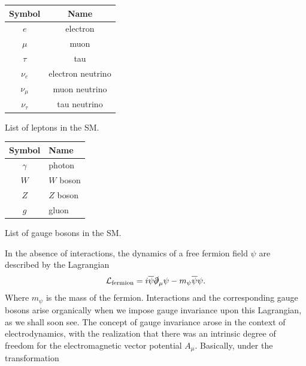 \begin{margintable}[-8cm]
  \centering
\begin{tabular}{c|c}
    Symbol & Name \\
  \hline
    $e$ & electron\\
    $\mu$ & muon \\
    $\tau$ & tau \\
    $\nu_e$ & electron neutrino \\
    $\nu_\mu$ & muon neutrino \\
    $\nu_\tau$ & tau neutrino \\
  \end{tabular}
  \caption{List of leptons in the SM.}
  \label{tab:leptons}
\end{margintable}

\begin{margintable}[-1cm]
  \centering
\begin{tabular}{c|l}
    Symbol & Name \\
  \hline
    $\gamma$ & photon\\
    $W$ & $W$ boson \\
    $Z$ & $Z$ boson \\
    $g$ & gluon \\
  \end{tabular}
  \caption{List of gauge bosons in the SM.}
  \label{tab:gaugebosons}
\end{margintable}

In the absence of interactions, the dynamics of a free fermion field $\psi$ are described by the Lagrangian
\begin{align}
  \mathcal{L}_\text{fermion} = i\overline{\psi}\slashed{\partial}_\mu\psi-m_{\psi}\overline{\psi}\psi.
\label{eq:fermion_lagrangian}
\end{align}
Where $m_\psi$ is the mass of the fermion. Interactions and the corresponding gauge bosons arise organically when we impose gauge invariance upon this Lagrangian, as we shall soon see. The concept of gauge invariance arose in the context of electrodynamics, with the realization that there was an intrinsic degree of freedom for the electromagnetic vector potential $A_\mu$. Basically, under the transformation 

